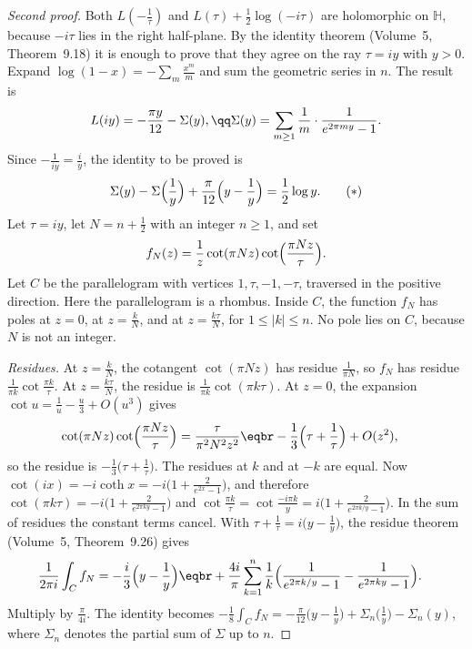 \begin{proof}[Second proof]
Both $L(-\frac1\tau)$ and $L(\tau)+\frac12\log(-i\tau)$ are holomorphic on $\mathbb H$, because $-i\tau$ lies in the right half-plane. By the identity theorem (Volume~5, Theorem~9.18) it is enough to prove that they agree on the ray $\tau=iy$ with $y>0$.
Expand $\log(1-x)=-\sum_m\frac{x^m}m$ and sum the geometric series in $n$. The result is
\[
L(iy)=-\frac{\pi y}{12}-\Sigma(y),\qq\Sigma(y)=\sum_{m\ge1}\frac1m\cdot\frac1{e^{2\pi my}-1}.
\]
Since $-\frac1{iy}=\frac iy$, the identity to be proved is
\[
\Sigma(y)-\Sigma\Bigl(\frac1y\Bigr)+\frac\pi{12}\Bigl(y-\frac1y\Bigr)=\frac12\log y.\tag{$\ast$}
\]
Let $\tau=iy$, let $N=n+\frac12$ with an integer $n\ge1$, and set
\[
f_N(z)=\frac1z\cot(\pi Nz)\cot\Bigl(\frac{\pi Nz}\tau\Bigr).
\]
Let $C$ be the parallelogram with vertices $1,\tau,-1,-\tau$, traversed in the positive direction. Here the parallelogram is a rhombus. Inside $C$, the function $f_N$ has poles at $z=0$, at $z=\frac kN$, and at $z=\frac{k\tau}N$, for $1\le|k|\le n$. No pole lies on $C$, because $N$ is not an integer.

\emph{Residues.} At $z=\frac kN$, the cotangent $\cot(\pi Nz)$ has residue $\frac1{\pi N}$, so $f_N$ has residue $\frac1{\pi k}\cot\frac{\pi k}\tau$. At $z=\frac{k\tau}N$, the residue is $\frac1{\pi k}\cot(\pi k\tau)$. At $z=0$, the expansion $\cot u=\frac1u-\frac u3+O(u^3)$ gives
\[
\begin{aligned}\cot(\pi Nz)\cot\Bigl(\frac{\pi Nz}\tau\Bigr)&=\frac\tau{\pi^2N^2z^2}\eqbr-\frac13\Bigl(\tau+\frac1\tau\Bigr)+O(z^2),\end{aligned}
\]
so the residue is $-\frac13\bigl(\tau+\frac1\tau\bigr)$. The residues at $k$ and at $-k$ are equal. Now $\cot(ix)=-i\coth x=-i\bigl(1+\frac2{e^{2x}-1}\bigr)$, and therefore $\cot(\pi k\tau)=-i\bigl(1+\frac2{e^{2\pi ky}-1}\bigr)$ and $\cot\frac{\pi k}\tau=\cot\frac{-i\pi k}y=i\bigl(1+\frac2{e^{2\pi k/y}-1}\bigr)$. In the sum of residues the constant terms cancel. With $\tau+\frac1\tau=i\bigl(y-\frac1y\bigr)$, the residue theorem (Volume~5, Theorem~9.26) gives
\[
\begin{aligned}\frac1{2\pi i}\int_Cf_N&=-\frac i3\Bigl(y-\frac1y\Bigr)\eqbr+\frac{4i}\pi\sum_{k=1}^n\frac1k\Bigl(\frac1{e^{2\pi k/y}-1}-\frac1{e^{2\pi ky}-1}\Bigr).\end{aligned}
\]
Multiply by $\frac\pi{4i}$. The identity becomes $-\frac18\int_Cf_N=-\frac\pi{12}\bigl(y-\frac1y\bigr)+\Sigma_n\bigl(\frac1y\bigr)-\Sigma_n(y)$, where $\Sigma_n$ denotes the partial sum of $\Sigma$ up to $n$.


\end{proof}
